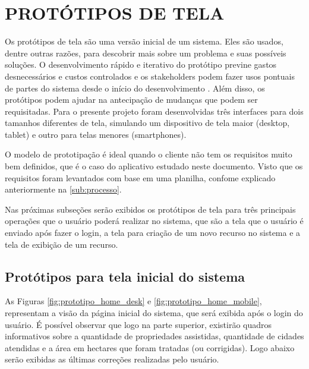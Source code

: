 \section{PROTÓTIPOS DE TELA}
\label{sec:titSecPrototipos}

Os protótipos de tela são uma versão inicial de um sistema. Eles são usados, dentre outras razões, para descobrir mais sobre um problema e suas possíveis soluções. O desenvolvimento rápido e iterativo do protótipo previne gastos desnecessários e custos controlados e os stakeholders podem fazer usos pontuais de partes do sistema desde o início do desenvolvimento .
Além disso, os protótipos podem ajudar na antecipação de mudanças que podem ser requisitadas.
Para o presente projeto foram desenvolvidas três interfaces para dois tamanhos diferentes de tela, simulando um dispositivo de tela maior (desktop, tablet) e outro para telas menores (smartphones).

O modelo de prototipação é ideal quando o cliente não tem os requisitos muito bem definidos, que é o caso do aplicativo estudado neste documento. Visto que os requisitos foram levantados com base em uma planilha, confome explicado anteriormente na \autoref{sub:processo}.

Nas próximas subseções serão exibidos os protótipos de tela para três principais operações que o usuário poderá realizar no sistema, que são a tela que o usuário é enviado após fazer o login, a tela para criação de um novo recurso no sistema e a tela de exibição de um recurso.

\subsection{Protótipos para tela inicial do sistema}
\label{sec:titSecPrototiposHome}

As Figuras \ref{fig:prototipo_home_desk} e \ref{fig:prototipo_home_mobile}, representam a visão da página inicial do sistema, que será exibida após o login do usuário. É possível observar que logo na parte superior, existirão quadros informativos sobre a quantidade de propriedades assistidas, quantidade de cidades atendidas e a área em hectares que foram tratadas (ou corrigidas). Logo abaixo serão exibidas as últimas correções realizadas pelo usuário.

